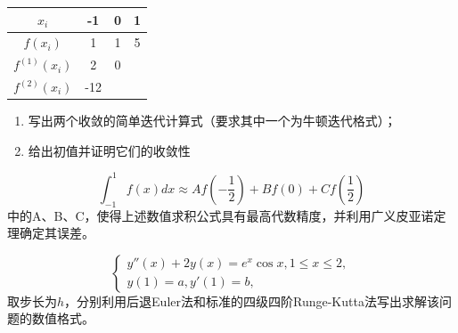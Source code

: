 \documentclass[12pt,a4paper]{article}
\begin{document}
\bigskip
{}

\begin{center}
\begin{tabular}{|c|c|c|c|}
\hline
$x_i$ & -1 & 0 & 1 \\
\hline
$f(x_i)$ & 1 & 1 & 5 \\
\hline
$f^{(1)}(x_i)$ & 2 & 0 & \\
\hline
$f^{(2)}(x_i)$ & -12 & & \\
\hline
\end{tabular}
\end{center}

\bigskip
{}

\bigskip
{}
\begin{enumerate}
\item[1)] 写出两个收敛的简单迭代计算式（要求其中一个为牛顿迭代格式）；
\item[2)] 给出初值并证明它们的收敛性
\end{enumerate}

\bigskip
{}
$$\int_{-1}^1 f(x)dx \approx Af(-\frac{1}{2}) + Bf(0) + Cf(\frac{1}{2})$$
\noindent 中的A、B、C，使得上述数值求积公式具有最高代数精度，并利用广义皮亚诺定理确定其误差。

\bigskip
{}

\bigskip
{}
$$\begin{cases}
y''(x) + 2y(x) = e^x \cos x, 1 \leq x \leq 2, \\
y(1) = a, y'(1) = b,
\end{cases}$$
\noindent 取步长为$h$，分别利用后退Euler法和标准的四级四阶Runge-Kutta法写出求解该问题的数值格式。
\end{document}
